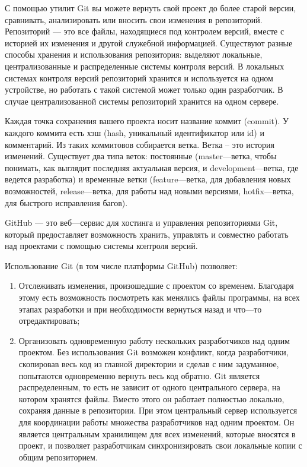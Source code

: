     С помощью утилит Git вы можете вернуть свой проект до более старой версии, сравнивать, анализировать или вносить свои изменения в репозиторий. Репозиторий — это все файлы, находящиеся под контролем версий, вместе с историей их изменения и другой служебной информацией. Существуют разные способы хранения и использования репозитория: выделяют локальные, централизованные и распределенные системы контроля версий. В локальных системах контроля версий репозиторий хранится и используется на одном устройстве, но работать с такой системой может только один разработчик. В случае централизованной системы репозиторий хранится на одном сервере.
    
    Каждая точка сохранения вашего проекта носит название коммит (commit). У каждого коммита есть хэш (hash, уникальный идентификатор или id) и комментарий. Из таких коммитовов собирается ветка. Ветка – это история изменений. Существует два типа веток: постоянные (master—ветка, чтобы понимать, как выглядит последняя актуальная версия, и development—ветка, где ведется разработка) и временные ветки (feature—ветка, для добавления новых возможностей, release—ветка, для работы над новыми версиями, hotfix—ветка, для быстрого исправления багов).
    
    GitHub — это веб—сервис для хостинга и управления репозиториями Git, который предоставляет возможность хранить, управлять и совместно работать над проектами с помощью системы контроля версий. 
    
    Использование Git (в том числе платформы GitHub) позволяет:
    \begin{enumerate}
        \item Отслеживать изменения, произошедшие с проектом со временем. Благодаря этому есть возможность посмотреть как менялись файлы программы, на всех этапах разработки и при необходимости вернуться назад и что—то отредактировать;
        \item Организовать одновременную работу нескольких разработчиков над одним проектом. Без использования Git возможен конфликт, когда разработчики, скопировав весь код из главной директории и сделав с ним задуманное, попытаются одновременно вернуть весь код обратно. Git является распределенным, то есть не зависит от одного центрального сервера, на котором хранятся файлы. Вместо этого он работает полностью локально, сохраняя данные в репозитории. При этом центральный сервер используется для координации работы множества разработчиков над одним проектом. Он является центральным хранилищем для всех изменений, которые вносятся в проект, и позволяет разработчикам синхронизировать свои локальные копии с общим репозиторием.
    \end{enumerate}

